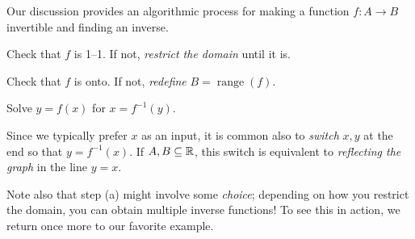
Our discussion provides an algorithmic process for making a function $f:A\to B$ invertible and finding an inverse.
\begin{enumeratea}\itemsep2pt
	\item Check that $f$ is 1--1. If not, \emph{restrict the domain} until it is.
	\item Check that $f$ is onto. If not, \emph{redefine} $B=\operatorname{range}(f)$.
	\item Solve $y=f(x)$ for $x=f^{-1}(y)$.
\end{enumeratea}

Since we typically prefer $x$ as an input, it is common also to \emph{switch} $x,y$ at the end so that $y=f^{-1}(x)$. If $A,B\subseteq\mathbb{R}$, this switch is equivalent to \emph{reflecting the graph} in the line $y=x$.\smallbreak

Note also that step (a) might involve some \emph{choice}; depending on how you restrict the domain, you can obtain multiple inverse functions! To see this in action, we return once more to our favorite example.

